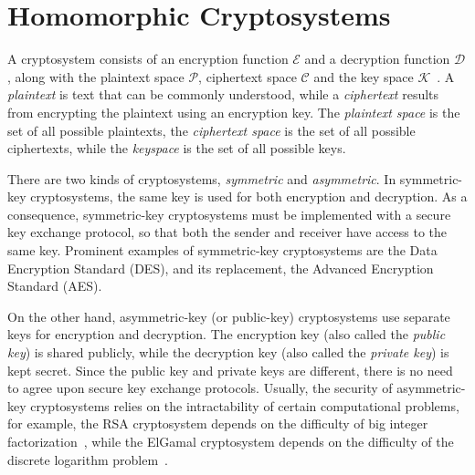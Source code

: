 \section{Homomorphic Cryptosystems}


A cryptosystem consists of an encryption function $\mathcal{E}$ and a decryption function $\mathcal{D}$, along with the plaintext space $\mathcal{P}$, ciphertext space $\mathcal{C}$ and the key space $\mathcal{K}$~\cite{bauer_cryptosystem_2005}. A \textit{plaintext} is text that can be commonly understood, while a \textit{ciphertext} results from encrypting the plaintext using an encryption key. The \textit{plaintext space} is the set of all possible plaintexts, the \textit{ciphertext space} is the set of all possible ciphertexts, while the \textit{keyspace} is the set of all possible keys.

There are two kinds of cryptosystems, \textit{symmetric} and \textit{asymmetric}. In symmetric-key cryptosystems, the same key is used for both encryption and decryption. As a consequence, symmetric-key cryptosystems must be implemented with a secure key exchange protocol, so that both the sender and receiver have access to the same key. Prominent examples of symmetric-key cryptosystems are the Data Encryption Standard (DES), and its replacement, the Advanced Encryption Standard (AES).

On the other hand, asymmetric-key (or public-key) cryptosystems use separate keys for encryption and decryption. The encryption key (also called the \textit{public key}) is shared publicly, while the decryption key (also called the \textit{private key}) is kept secret. Since the public key and private keys are different, there is no need to agree upon secure key exchange protocols. Usually, the security of asymmetric-key cryptosystems relies on the intractability of certain computational problems, for example, the RSA cryptosystem depends on the difficulty of big integer factorization~\cite{rivest_method_1978}, while the ElGamal cryptosystem depends on the difficulty of the discrete logarithm problem~\cite{blakley_public_1985}.


